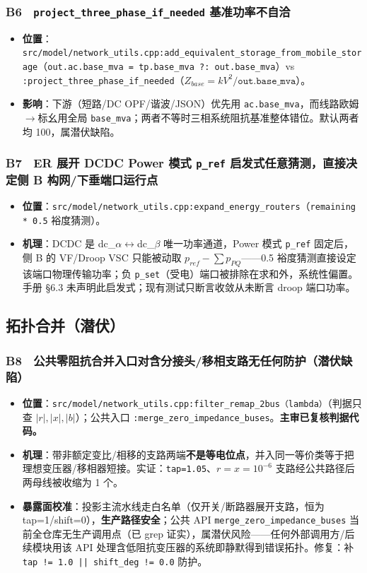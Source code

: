 \documentclass[11pt,a4paper,fontset=fandol]{ctexart}
\newcommand{\file}[1]{\texttt{#1}}
\begin{document}
\subsubsection*{B6　\texttt{project\_three\_phase\_if\_needed} 基准功率不自洽}
\begin{itemize}
  \item \textbf{位置}：\file{src/model/network\_utils.cpp:add\_equivalent\_storage\_from\_mobile\_storage}（\texttt{out.ac.base\_mva = tp.base\_mva ?: out.base\_mva}）vs \file{:project\_three\_phase\_if\_needed}（$Z_{base}=kV^2/\texttt{out.base\_mva}$）。
  \item \textbf{影响}：下游（短路/DC OPF/谐波/JSON）优先用 \texttt{ac.base\_mva}，而线路欧姆$\to$标幺用全局 \texttt{base\_mva}；两者不等时三相系统阻抗基准整体错位。默认两者均 100，属潜伏缺陷。
\end{itemize}

\subsubsection*{B7　ER 展开 DCDC Power 模式 \texttt{p\_ref} 启发式任意猜测，直接决定侧 B 构网/下垂端口运行点}
\begin{itemize}
  \item \textbf{位置}：\file{src/model/network\_utils.cpp:expand\_energy\_routers}（\texttt{remaining * 0.5} 裕度猜测）。
  \item \textbf{机理}：DCDC 是 dc\_$\alpha\leftrightarrow$dc\_$\beta$ 唯一功率通道，Power 模式 \texttt{p\_ref} 固定后，侧 B 的 VF/Droop VSC 只能被动取 $p_{ref}-\sum p_{PQ}$——0.5 裕度猜测直接设定该端口物理传输功率；负 \texttt{p\_set}（受电）端口被排除在求和外，系统性偏置。手册 \S 6.3 未声明此启发式；现有测试只断言收敛从未断言 droop 端口功率。
\end{itemize}

\subsection{拓扑合并（潜伏）}

\subsubsection*{B8　公共零阻抗合并入口对含分接头/移相支路无任何防护（潜伏缺陷）}
\begin{itemize}
  \item \textbf{位置}：\file{src/model/network\_utils.cpp:filter\_remap\_2bus（lambda）}（判据只查 $|r|,|x|,|b|$）；公共入口 \file{:merge\_zero\_impedance\_buses}。\textbf{主审已复核判据代码。}
  \item \textbf{机理}：带非额定变比/相移的支路两端\textbf{不是等电位点}，并入同一等价类等于把理想变压器/移相器短接。实证：\texttt{tap=1.05}、$r=x=10^{-6}$ 支路经公共路径后两母线被收缩为 1 个。
  \item \textbf{暴露面校准}：投影主流水线走白名单（仅开关/断路器展开支路，恒为 tap=1/shift=0），\textbf{生产路径安全}；公共 API \file{merge\_zero\_impedance\_buses} 当前全仓库无生产调用点（已 grep 证实），属潜伏风险——任何外部调用方/后续模块用该 API 处理含低阻抗变压器的系统即静默得到错误拓扑。修复：补 \texttt{tap != 1.0 || shift\_deg != 0.0} 防护。
\end{itemize}
\end{document}
